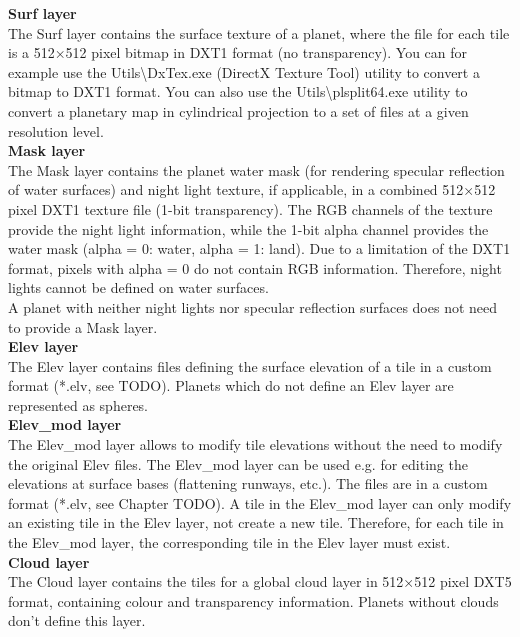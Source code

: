 \documentclass[Orbiter Developer Manual.tex]{subfiles}
\begin{document}
\noindent
\textbf{Surf layer}\\
The Surf layer contains the surface texture of a planet, where the file for each tile is a 512×512 pixel bitmap in DXT1 format (no transparency). You can for example use the Utils\textbackslash DxTex.exe (DirectX Texture Tool) utility to convert a bitmap to DXT1 format. You can also use the Utils\textbackslash plsplit64.exe utility to convert a planetary map in cylindrical projection to a set of files at a given resolution level.\\

\noindent
\textbf{Mask layer}\\
The Mask layer contains the planet water mask (for rendering specular reflection of water surfaces) and night light texture, if applicable, in a combined  512×512 pixel DXT1 texture file (1-bit transparency). The RGB channels of the texture provide the night light information, while the 1-bit alpha channel provides the water mask (alpha = 0: water, alpha = 1: land). Due to a limitation of the DXT1 format, pixels with alpha = 0 do not contain RGB information. Therefore, night lights cannot be defined on water surfaces.\\
A planet with neither night lights nor specular reflection surfaces does not need to provide a Mask layer.\\

\noindent
\textbf{Elev layer}\\
The Elev layer contains files defining the surface elevation of a tile in a custom format (*.elv, see TODO). Planets which do not define an Elev layer are represented as spheres.\\

\noindent
\textbf{Elev\_mod layer}\\
The Elev\_mod layer allows to modify tile elevations without the need to modify the original Elev files. The Elev\_mod layer can be used e.g. for editing the elevations at surface bases (flattening runways, etc.). The files are in a custom format (*.elv, see Chapter TODO). A tile in the Elev\_mod layer can only modify an existing tile in the Elev layer, not create a new tile. Therefore, for each tile in the Elev\_mod layer, the corresponding tile in the Elev layer must exist.\\

\noindent
\textbf{Cloud layer}\\
The Cloud layer contains the tiles for a global cloud layer in 512×512 pixel DXT5 format, containing colour and transparency information. Planets without clouds don't define this layer.\\
\end{document}
